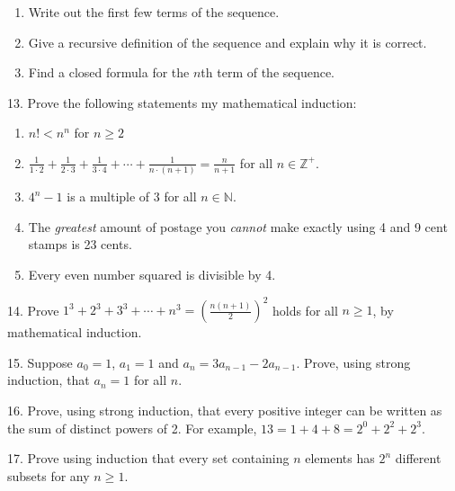 \documentclass[10pt,]{book}
\theoremstyle{plain}
\theoremstyle{definition}
\theoremstyle{definition}
\theoremstyle{definition}
\numberwithin{equation}{chapter}
\def\d{\displaystyle}
\def\N{\mathbb N}
\def\Z{\mathbb Z}
\newcommand{\lt}{ < }
\begin{document}
\begin{exerciselist}
\begin{enumerate}[label=(\alph*)]
\item\hypertarget{li-997}{}
                Write out the first few terms of the sequence.
\item\hypertarget{li-998}{}
                Give a recursive definition of the sequence and explain why it is correct.
\item\hypertarget{li-999}{}
                Find a closed formula for the \(n\)th term of the sequence.
\end{enumerate}
\par\smallskip
\item[13.]\hypertarget{exercise-200}{}
            Prove the following statements my mathematical induction:
\leavevmode%
\begin{enumerate}[label=(\alph*)]
\item\hypertarget{li-1003}{}\(n! \lt  n^n\) for \(n \ge 2\)%
\item\hypertarget{li-1004}{}\(\d\frac{1}{1\cdot 2} + \frac{1}{2\cdot 3} +\frac{1}{3\cdot 4}+\cdots + \frac{1}{n\cdot(n+1)} = \d\frac{n}{n+1}\) for all \(n \in \Z^+\).%
\item\hypertarget{li-1005}{}\(4^n - 1\) is a multiple of 3 for all \(n \in \N\).%
\item\hypertarget{li-1006}{}
                The \emph{greatest} amount of postage you \emph{cannot} make exactly using 4 and 9 cent stamps is 23 cents.
\item\hypertarget{li-1007}{}
                Every even number squared is divisible by 4.
\end{enumerate}
\par\smallskip
\item[14.]\hypertarget{exercise-201}{}
            Prove \(1^3 + 2^3 + 3^3 + \cdots + n^3 = \left(\frac{n(n+1)}{2}\right)^2\) holds for all \(n \ge 1\), by mathematical induction.
\par\smallskip
\item[15.]\hypertarget{exercise-202}{}
            Suppose \(a_0 = 1\), \(a_1 = 1\) and \(a_n = 3a_{n-1} - 2a_{n-1}\). Prove, using strong induction, that \(a_n = 1\) for all \(n\).
\par\smallskip
\item[16.]\hypertarget{exercise-203}{}
            Prove, using strong induction, that every positive integer can be written as the sum of distinct powers of 2. For example, \(13 = 1 + 4 + 8 = 2^0 + 2^2 + 2^3\).
\par\smallskip
\item[17.]\hypertarget{exercise-204}{}
            Prove using induction that every set containing \(n\) elements has \(2^n\) different subsets for any \(n \ge 1\).
\par\smallskip
\end{exerciselist}
\typeout{************************************************}
\typeout{************************************************}
\end{document}
